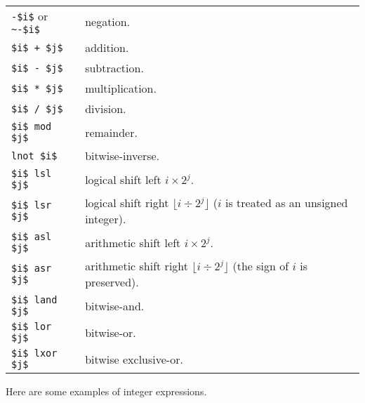 \label{keyword:+}
\label{keyword:-}
\label{keyword:*}
\label{keyword:/}
\label{keyword:mod}
\label{keyword:lnot}
\label{keyword:lsl}
\label{keyword:lsr}
\label{keyword:asl}
\label{keyword:asr}
\label{keyword:land}
\label{keyword:lor}
\label{keyword:lxor}
\begin{center}
\begin{tabular}{ll}
\index{-@\lstinline$~-$ negation}
\hbox{\hbox{\lstinline/-$i$/}} or \hbox{\lstinline/~-$i$/} & negation.\\
\index{+@\lstinline$+$ integer addition}
\hbox{\hbox{\lstinline/$i$ + $j$/}}    & addition.\\
\index{-@\lstinline$-$ integer subtraction}
\hbox{\hbox{\lstinline/$i$ - $j$/}}    & subtraction.\\
\index{*@\lstinline$*$ integer multiplication}
\hbox{\hbox{\lstinline/$i$ * $j$/}}    & multiplication.\\
\index{/@\lstinline$/$ integer division}
\hbox{\lstinline+$i$ / $j$+}    & division.\\
\index{mod@\lstinline$mod$ integer modulus}
\hbox{\hbox{\lstinline/$i$ mod $j$/}}  & remainder.\\
\misspelled{\index{lnot@\lstinline$lnot$ bitwise negation}}
\hbox{\hbox{\lstinline/lnot $i$/}}     & bitwise-inverse.\\
\misspelled{\index{lsl@\lstinline$lsl$ logical shift left}}
\hbox{\hbox{\lstinline/$i$ lsl $j$/}}  & logical shift left $i \times 2^j$.\\
\misspelled{\index{lsr@\lstinline$lsr$ logical shift right}}
\hbox{\hbox{\lstinline/$i$ lsr $j$/}}  & logical shift right $\lfloor i \div 2^j \rfloor$ ($i$ is treated as an unsigned integer).\\
\misspelled{\index{asl@\lstinline$asl$ arithmetic shift left}}
\hbox{\hbox{\lstinline/$i$ asl $j$/}}  & arithmetic shift left $i \times 2^j$.\\
\misspelled{\index{asr@\lstinline$asr$ arithmetic shift right}}
\hbox{\hbox{\lstinline/$i$ asr $j$/}}  & arithmetic shift right $\lfloor i \div 2^j \rfloor$ (the sign of $i$ is preserved).\\
\misspelled{\index{land@\lstinline$land$ bitwise conjunction}}
\hbox{\hbox{\lstinline/$i$ land $j$/}} & bitwise-and.\\
\misspelled{\index{lor@\lstinline$lor$ bitwise disjunction}}
\hbox{\hbox{\lstinline/$i$ lor $j$/}}  & bitwise-or.\\
\misspelled{\index{lxor@\lstinline$lxor$ bitwise exclusive-or}}
\hbox{\hbox{\lstinline/$i$ lxor $j$/}} & bitwise exclusive-or.
\end{tabular}
\end{center}
%
Here are some examples of integer expressions.

